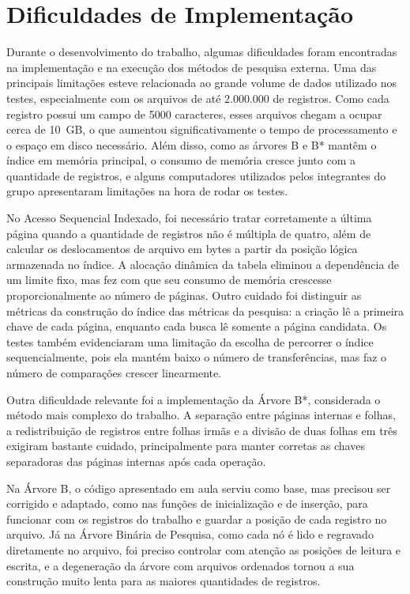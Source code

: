 \documentclass[12pt,a4paper]{article}
\begin{document}
\section{Dificuldades de Implementação}

Durante o desenvolvimento do trabalho, algumas dificuldades foram encontradas na
implementação e na execução dos métodos de pesquisa externa. Uma das principais
limitações esteve relacionada ao grande volume de dados utilizado nos testes,
especialmente com os arquivos de até 2.000.000 de registros. Como cada registro possui
um campo de 5000 caracteres, esses arquivos chegam a ocupar cerca de 10~GB, o que
aumentou significativamente o tempo de processamento e o espaço em disco necessário.
Além disso, como as árvores B e B* mantêm o índice em memória principal, o consumo de
memória cresce junto com a quantidade de registros, e alguns computadores utilizados
pelos integrantes do grupo apresentaram limitações na hora de rodar os testes.

No Acesso Sequencial Indexado, foi necessário tratar corretamente a última página
quando a quantidade de registros não é múltipla de quatro, além de calcular os
deslocamentos de arquivo em bytes a partir da posição lógica armazenada no índice. A
alocação dinâmica da tabela eliminou a dependência de um limite fixo, mas fez com que
seu consumo de memória crescesse proporcionalmente ao número de páginas. Outro cuidado
foi distinguir as métricas da construção do índice das métricas da pesquisa: a criação
lê a primeira chave de cada página, enquanto cada busca lê somente a página candidata.
Os testes também evidenciaram uma limitação da escolha de percorrer o índice
sequencialmente, pois ela mantém baixo o número de transferências, mas faz o número de
comparações crescer linearmente.

Outra dificuldade relevante foi a implementação da Árvore B*, considerada o método mais
complexo do trabalho. A separação entre páginas internas e folhas, a redistribuição de
registros entre folhas irmãs e a divisão de duas folhas em três exigiram bastante
cuidado, principalmente para manter corretas as chaves separadoras das páginas
internas após cada operação.

Na Árvore B, o código apresentado em aula serviu como base, mas precisou ser corrigido
e adaptado, como nas funções de inicialização e de inserção, para funcionar com os
registros do trabalho e guardar a posição de cada registro no arquivo. Já na Árvore
Binária de Pesquisa, como cada nó é lido e regravado diretamente no arquivo, foi
preciso controlar com atenção as posições de leitura e escrita, e a degeneração da
árvore com arquivos ordenados tornou a sua construção muito lenta para as maiores
quantidades de registros.
\end{document}
